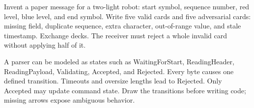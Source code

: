 \begin{buildbox}[title={HUMAN PARSER LAB}]
Invent a paper message for a two-light robot: start symbol, sequence number, red level, blue level, and end symbol. Write five valid cards and five adversarial cards: missing field, duplicate sequence, extra character, out-of-range value, and stale timestamp. Exchange decks. The receiver must reject a whole invalid card without applying half of it.
\end{buildbox}

\begin{advancedbox}[title={STATE MACHINES BEAT WISHFUL PARSING}]
A parser can be modeled as states such as WaitingForStart, ReadingHeader, ReadingPayload, Validating, Accepted, and Rejected. Every byte causes one defined transition. Timeouts and oversize lengths lead to Rejected. Only Accepted may update command state. Draw the transitions before writing code; missing arrows expose ambiguous behavior.
\end{advancedbox}
